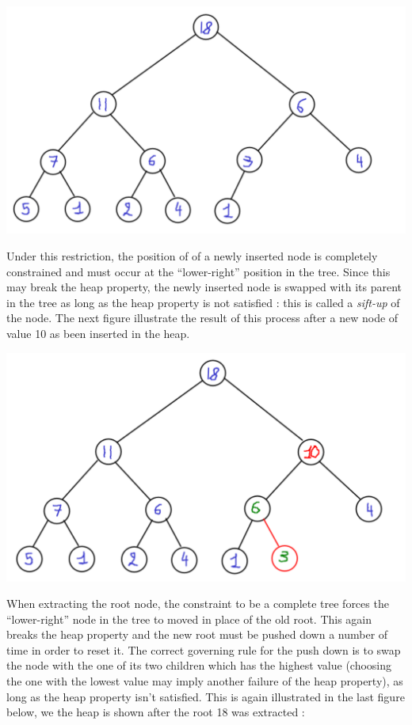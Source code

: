 \documentclass[12pt]{article}
\theoremstyle{plain}
\theoremstyle{remark}
\begin{document}
\begin{center}
	\includegraphics[width=14cm]{data/heap1.pdf}
\end{center}

Under this restriction, the position of of a newly inserted node is completely
constrained  and must occur at the ``lower-right'' position in the tree. Since
this may break the heap property, the newly inserted node is swapped with its 
parent in the tree as long as the heap property is not satisfied : this is
called a {\it sift-up} of the node. The next figure illustrate the result of
this process after a new node of value 10 as been inserted in the heap. 

\begin{center}
	\includegraphics[width=14cm]{data/heap2.pdf}
\end{center}

When extracting the root node, the constraint to be a complete tree forces the
``lower-right'' node in the tree to moved in place of the old root. This again
breaks the heap property and the new root must be pushed down a number of time
in order to reset it. The correct governing rule for the push down is to swap
the node with the one of its two children which has the highest value (choosing
the one with the lowest value may imply another failure of the heap property),
as long as the heap property isn't satisfied. This is again illustrated in the
last figure below, we the heap is shown after the root 18 was extracted :
\end{document}
